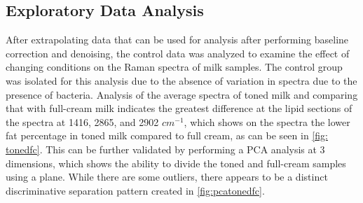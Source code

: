 \subsection{Exploratory Data Analysis}

After extrapolating data that can be used for analysis after performing baseline correction and denoising, the control data was analyzed to examine the effect of changing conditions on the Raman spectra of milk samples. The control group was isolated for this analysis due to the absence of variation in spectra due to the presence of bacteria. Analysis of the average spectra of toned milk and comparing that with full-cream milk indicates the greatest difference at the lipid sections of the spectra at 1416, 2865, and 2902 $cm^{-1}$, which shows on the spectra the lower fat percentage in toned milk compared to full cream, as can be seen in \autoref{fig: tonedfc}. This can be further validated by performing a PCA analysis at 3 dimensions, which shows the ability to divide the toned and full-cream samples using a plane. While there are some outliers, there appears to be a distinct discriminative separation pattern created in \autoref{fig:pcatonedfc}. \\

